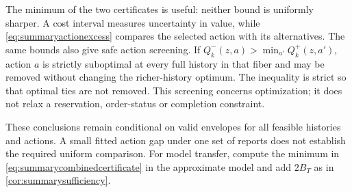The minimum of the two certificates is useful: neither bound is uniformly
sharper. A cost interval measures uncertainty in value, while
\eqref{eq:summaryactionexcess} compares the selected action with its
alternatives. The same bounds also give safe action screening. If
$Q_k^-(z,a)>\min_{a'} Q_k^+(z,a')$, action $a$ is strictly suboptimal at every
full history in that fiber and may be removed without changing the
richer-history optimum. The inequality is strict so that optimal ties are
not removed. This screening concerns optimization; it does not relax a
reservation, order-status or completion constraint.

These conclusions remain conditional on valid envelopes for all feasible
histories and actions. A small fitted action gap under one set of reports
does not establish the required uniform comparison. For model transfer,
compute the minimum in \eqref{eq:summarycombinedcertificate} in the
approximate model and add $2B_T$ as in \cref{cor:summarysufficiency}.
